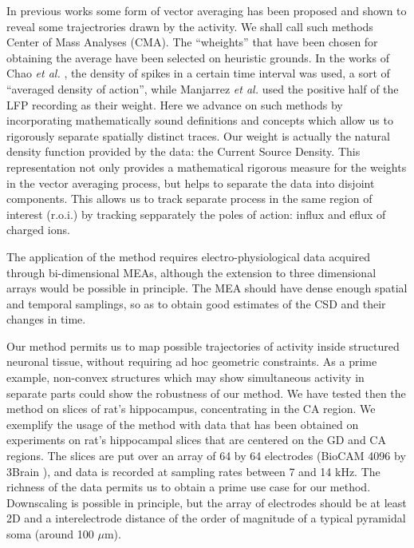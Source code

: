 \documentclass[12pt]{article}
\begin{document}
In previous works some form of vector averaging has been proposed and shown to reveal some trajectrories drawn by the activity. We shall call such methods Center of Mass Analyses (CMA).  The ``wheights'' that have been chosen for obtaining the average have been selected on heuristic grounds. In the works of Chao \emph{et al.} \cite{Chao05, Chao07}, the density of spikes in a certain time interval was used, a sort of ``averaged density of action'', while Manjarrez \emph{et al.} \cite{Manjarrez07, Manjarrez09} used the positive half of the LFP recording as their weight. 
Here we advance on such methods by incorporating mathematically sound definitions and concepts which allow us to rigorously separate spatially distinct traces. Our weight is actually the natural density function provided by the data: the Current Source Density. This representation not only provides a mathematical rigorous  measure for the weights in the vector averaging process, but helps to separate the data into disjoint components. This allows us to track separate process in the same region of interest (r.o.i.) by tracking sepparately the poles of action: influx and eflux of charged ions. 

The application of the method requires electro-physiological data acquired through bi-dimensional MEAs, although the extension to three dimensional arrays would be possible in principle. The MEA should have dense enough spatial and temporal samplings, so as to obtain good estimates of the CSD and their changes in time.

Our method permits us to map possible trajectories of activity inside structured neuronal tissue, without requiring ad hoc geometric constraints. As a prime example, non-convex structures which may show simultaneous activity in separate parts could show the robustness of our method. We have tested then the method on slices of rat's hippocampus, concentrating in the CA region. We exemplify the usage of the method with data that has been obtained on experiments on rat's hippocampal slices that are centered on the GD and CA
regions. The slices are put over an array of 64 by 64 electrodes
(BioCAM 4096 by 3Brain \cite{BioCam}),
and data is recorded at sampling rates between 7 and 14 kHz. The richness of the
data permits us to obtain a prime use case for our method. Downscaling is
possible in principle, but the array of electrodes should be at least 2D and
a interelectrode distance of the order of magnitude of a typical pyramidal soma
(around 100 $\mu$m). 
\end{document}
